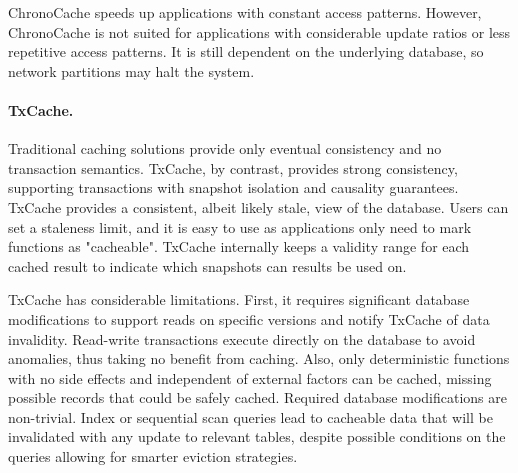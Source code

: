ChronoCache speeds up applications with constant access patterns.
However, ChronoCache is not suited for applications with considerable update ratios or less repetitive access patterns.
It is still dependent on the underlying database, so network partitions may halt the system.


%


\paragraph{TxCache.} Traditional caching solutions provide only eventual consistency and no transaction semantics.
TxCache, by contrast, provides strong consistency, supporting transactions with snapshot isolation and causality guarantees.
TxCache provides a consistent, albeit likely stale, view of the database.
Users can set a staleness limit, and it is easy to use as applications only need to mark functions as "cacheable".
TxCache internally keeps a validity range for each cached result to indicate which snapshots can results be used on.

TxCache has considerable limitations.
First, it requires significant database modifications to support reads on specific versions and notify TxCache of data invalidity.
Read-write transactions execute directly on the database to avoid anomalies, thus taking no benefit from caching.
Also, only deterministic functions with no side effects and independent of external factors can be cached, missing possible records that could be safely cached.
Required database modifications are non-trivial.
Index or sequential scan queries lead to cacheable data that will be invalidated with any update to relevant tables, despite possible conditions on the queries allowing for smarter eviction strategies.

